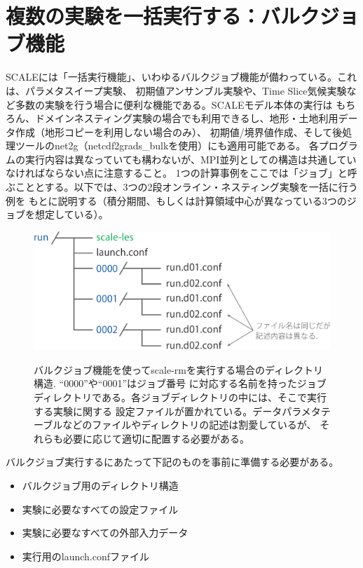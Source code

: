 \section{複数の実験を一括実行する：バルクジョブ機能} \label{sec:bulkjob}

SCALEには「一括実行機能」、いわゆるバルクジョブ機能が備わっている。これは、パラメタスイープ実験、
初期値アンサンブル実験や、Time Slice気候実験など多数の実験を行う場合に便利な機能である。SCALEモデル本体の実行は
もちろん、ドメインネスティング実験の場合でも利用できるし、地形・土地利用データ作成（地形コピーを利用しない場合のみ）、
初期値/境界値作成、そして後処理ツールのnet2g（netcdf2grads\_bulkを使用）にも適用可能である。
各プログラムの実行内容は異なっていても構わないが、MPI並列としての構造は共通していなければならない点に注意すること。
1つの計算事例をここでは「ジョブ」と呼ぶこととする。以下では、3つの2段オンライン・ネスティング実験を一括に行う例を
もとに説明する（積分期間、もしくは計算領域中心が異なっている3つのジョブを想定している）。


\begin{figure}[t]
\begin{center}
  \includegraphics[width=0.6\hsize]{./figure/bulkjob_directory_structure.eps}\\
  \caption{バルクジョブ機能を使ってscale-rmを実行する場合のディレクトリ構造. ``0000''や``0001''はジョブ番号
           に対応する名前を持ったジョブディレクトリである。各ジョブディレクトリの中には、そこで実行する実験に関する
           設定ファイルが置かれている。データパラメタテーブルなどのファイルやディレクトリの記述は割愛しているが、
           それらも必要に応じて適切に配置する必要がある。}
  \label{fig_bulkjob}
\end{center}
\end{figure}


バルクジョブ実行するにあたって下記のものを事前に準備する必要がある。
\begin{itemize}
\item バルクジョブ用のディレクトリ構造
\item 実験に必要なすべての設定ファイル
\item 実験に必要なすべての外部入力データ
\item 実行用のlaunch.confファイル
\end{itemize}

